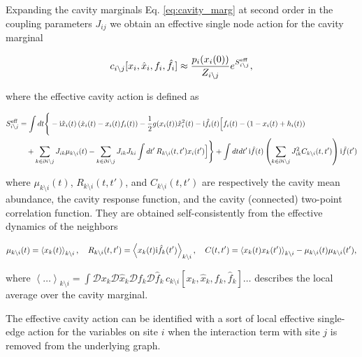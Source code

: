 \documentclass[
    preprint,
    linenumbers,
    amsmath,amssymb,amsfonts,
    aps, physrev,
    superscriptaddress,
    10pt,
    bibnotes
    ]{revtex4-2}
\begin{document}
Expanding the cavity marginals Eq. \eqref{eq:cavity_marg} at
second order in the coupling parameters $J_{ij}$ we obtain an effective single node action for the cavity marginal

\begin{equation}
  c_{i\setminus j}[x_{i},\hat{x}_{i}, f_i, \hat{f}_i] \approx \frac{p_i(x_i(0))}{Z_{i\setminus j}}e^{S^{\rm eff}_{i\setminus j}},
\end{equation}

where the effective cavity action is defined as

\begin{align}
  S^{\rm eff}_{i\setminus j} & = \int dt \Bigg\{-{\rm i}\hat{x}_i(t)\left(\dot{x}_i(t)-x_i(t)f_i(t)\right)-\frac{1}{2}g(x_i(t))\hat{x}_i^2(t)-{\rm i}\hat{f}_i(t)\Big[f_i(t)-\left(1-x_i(t)+h_i(t)\right) \nonumber \\
  & \quad  + \sum_{k\in\partial i \setminus j}J_{ik}\mu_{k\setminus i}(t)- \sum_{k\in\partial i \setminus j}J_{ik}J_{ki}\int dt' \, R_{k\setminus i}(t,t')x_i(t')\Big]\Bigg\}+\int dtdt' \, {\rm i}\hat{f}(t)\left(  \sum_{k\in\partial i \setminus j}J_{ik}^2 C_{k\setminus i}(t,t')\right){\rm i}\hat{f}(t')
\end{align}

where $\mu_{k\setminus i}(t)$, $R_{k\setminus i}(t,t')$, and $C_{k\setminus i}(t,t')$
are respectively the cavity mean abundance, the cavity response function, and the cavity (connected) two-point correlation function. They are obtained self-consistently from the effective dynamics of the neighbors

\begin{equation}
\mu_{k\setminus i}(t)=\left\langle x_{k}(t)\right\rangle _{k\setminus i},\quad R_{k\setminus i}(t,t')=\left\langle x_{k}(t){\rm i}\hat{f}_{k}(t')\right\rangle _{k\setminus i},\quad C(t,t')=\left\langle x_{k}(t)x_{k}(t')\right\rangle _{k\setminus i} - \mu_{k\setminus i}(t)\mu_{k\setminus i}(t'),
\end{equation}

where $\left\langle \dots\right\rangle _{k\setminus i}=\int{\mathcal{D}x_k\mathcal{D}\hat{x}_k\mathcal{D}f_k\mathcal{D}\hat{f}_k} \, c_{k\setminus i}[x_{k},\hat{x}_{k}, f_k, \hat{f}_k] \dots$
describes the local average over the cavity marginal.

The effective cavity action can be identified with a sort of local effective single-edge action for the variables on site $i$ when the interaction term with site $j$ is removed from the underlying graph.
\end{document}
